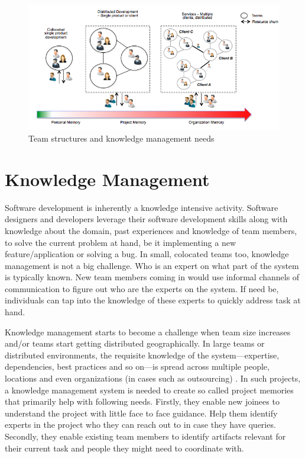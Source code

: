 
\begin{figure}
	\center
	\includegraphics[scale=0.7]{figs/km-types.png}
	\caption{Team structures and knowledge management needs}
	\label{fig-km}
\end{figure}

\section{Knowledge Management}
\label{sec:km}

Software development is inherently a knowledge intensive activity. Software designers and developers leverage their software development skills along with knowledge about the domain, past experiences and knowledge of team members, to solve the current problem at hand, be it implementing a new feature/application or solving a bug. 
In small, colocated teams too, knowledge management is not a big challenge. Who is an expert on what part of the system is typically known. New team members coming in would use informal channels of communication to figure out who are the experts on the system. If need be, individuals can tap into the knowledge of these experts to quickly address task at hand. 

Knowledge management starts to become a challenge when team size increases and/or teams start getting distributed geographically. In large teams or distributed environments, the requisite knowledge of the system---expertise, dependencies, best practices and so on---is spread across multiple people, locations and even organizations (in cases such as outsourcing) \cite{Desouza:2006}. In such projects, a knowledge management system is needed to create so called project memories that primarily help with following needs. Firstly, they enable new joinees to understand the project with little face to face guidance. Help them identify experts in the project who they can reach out to in case they have queries. Secondly, they enable existing team members to identify artifacts relevant for their current task and people they might need to coordinate with. 


